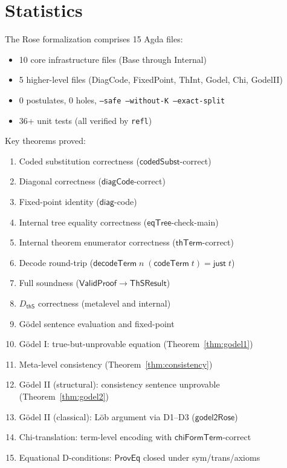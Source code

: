 \documentclass[11pt]{article}
\newcommand{\codeTerm}{\mathsf{codeTerm}}
\newcommand{\decodeTerm}{\mathsf{decodeTerm}}
\newcommand{\diagCode}{\mathsf{diagCode}}
\newcommand{\diag}{\mathsf{diag}}
\newcommand{\thS}{\mathsf{thS}}
\newcommand{\thTerm}{\mathsf{thTerm}}
\newcommand{\eqTree}{\mathsf{eqTree}}
\newcommand{\codedSubst}{\mathsf{codedSubst}}
\newcommand{\dThS}{D_{\thS}}
\newcommand{\ValidProof}{\mathsf{ValidProof}}
\newcommand{\ThSResult}{\mathsf{ThSResult}}
\begin{document}
\section{Statistics}

The Rose formalization comprises 15 Agda files:
\begin{itemize}
  \item 10 core infrastructure files (Base through Internal)
  \item 5 higher-level files (DiagCode, FixedPoint, ThInt, Godel, Chi, GodelII)
  \item 0 postulates, 0 holes, \texttt{--safe --without-K --exact-split}
  \item 36+ unit tests (all verified by \texttt{refl})
\end{itemize}

\noindent Key theorems proved:
\begin{enumerate}
  \item Coded substitution correctness ($\codedSubst$-correct)
  \item Diagonal correctness ($\diagCode$-correct)
  \item Fixed-point identity ($\diag$-code)
  \item Internal tree equality correctness ($\eqTree$-check-main)
  \item Internal theorem enumerator correctness ($\thTerm$-correct)
  \item Decode round-trip ($\decodeTerm\;n\;(\codeTerm\;t) = \mathsf{just}\;t$)
  \item Full soundness ($\ValidProof \to \ThSResult$)
  \item $\dThS$ correctness (metalevel and internal)
  \item G\"odel sentence evaluation and fixed-point
  \item G\"odel I: true-but-unprovable equation (Theorem~\ref{thm:godel1})
  \item Meta-level consistency (Theorem~\ref{thm:consistency})
  \item G\"odel II (structural): consistency sentence unprovable (Theorem~\ref{thm:godel2})
  \item G\"odel II (classical): L\"ob argument via D1--D3 ($\mathsf{godel2Rose}$)
  \item Chi-translation: term-level encoding with $\mathsf{chiFormTerm}$-correct
  \item Equational D-conditions: $\mathsf{ProvEq}$ closed under sym/trans/axioms
\end{enumerate}
\end{document}
